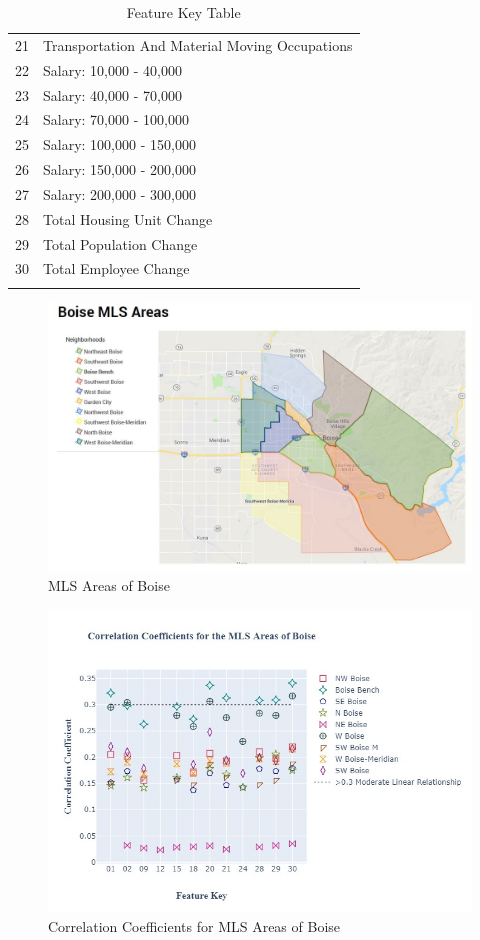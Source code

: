 \documentclass{article}
\begin{document}
\begin{table}[H]
{\begin{tabular}{|c|l|}
    \Xhline{1 pt} 
    21     &  Transportation And Material Moving Occupations\\
    \Xhline{1 pt} 
    22  & Salary: 10,000 - 40,000\\
    \Xhline{1 pt} 
    23  & Salary: 40,000 - 70,000\\
    \Xhline{1 pt} 
    24  & Salary: 70,000 - 100,000\\
    \Xhline{1 pt} 
    25  & Salary: 100,000 - 150,000\\
    \Xhline{1 pt} 
    26  & Salary: 150,000 - 200,000\\
    \Xhline{1 pt} 
    27  & Salary: 200,000 - 300,000\\
    \Xhline{1 pt} 
    28  & Total Housing Unit Change\\
    \Xhline{1 pt} 
    29  & Total Population Change\\
    \Xhline{1 pt} 
    30  & Total Employee Change \\
    \Xhline{1 pt} 
    \end{tabular}}
    \caption{Feature Key Table}
    \label{tab: feature_key}
\end{table}





\begin{figure}[H]
    \centering
    \includegraphics[width= .7\linewidth]{images/MLS_Areas.JPG}
    \caption{MLS Areas of Boise}
    \label{fig: mls_map}
\end{figure}

\begin{figure}[H]
    \centering
    \includegraphics[width= .7\linewidth]{images/Area_fig.jpg}
    \caption{Correlation Coefficients for MLS Areas of Boise}
    \label{fig: area_ccl}
\end{figure}
\end{document}
